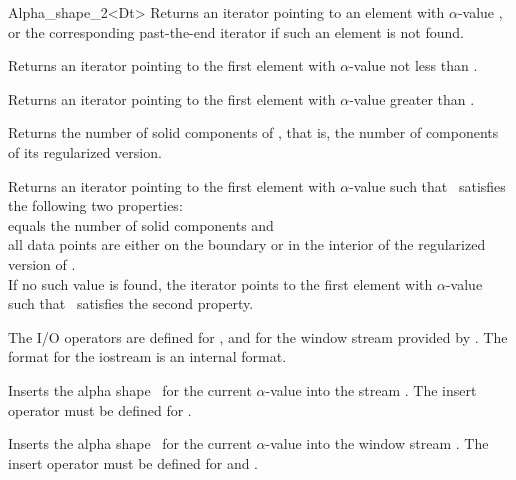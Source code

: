 \begin{ccRefClass} {Alpha_shape_2<Dt>}
{Returns an iterator pointing to an element with $\alpha$-value
, or the corresponding past-the-end iterator if such 
an element is not found.}

{Returns an iterator pointing to the first element with
$\alpha$-value not less than .}

{Returns an iterator pointing to the first element with $\alpha$-value
greater than .}


{Returns the number of solid components of \ccVar, that is, the number of
components of its 
regularized version.}

{Returns an iterator pointing to the first element with $\alpha$-value
such that \ccVar\ satisfies the following two properties:\\
 equals the number of solid components and \\
all data points are either on the boundary or in the interior of the regularized version of \ccVar.\\
If no such value is found, the iterator points to the first element with 
$\alpha$-value such that \ccVar\ satisfies the second property.}


The I/O operators are defined for , and for
the window stream provided by \cgal. The format for the iostream
is an internal format. 


{Inserts the alpha shape \ccVar\ for the current $\alpha$-value into the stream .
\ccPrecond The insert operator must be defined for .}



{Inserts the alpha shape \ccVar\ for the current $\alpha$-value into the window stream .
\ccPrecond The insert operator must be defined for  and .}


\end{ccRefClass}

